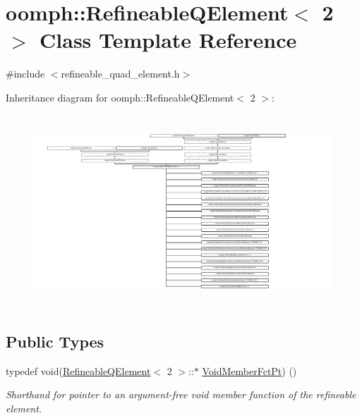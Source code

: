 \hypertarget{classoomph_1_1RefineableQElement_3_012_01_4}{}\section{oomph\+:\+:Refineable\+Q\+Element$<$ 2 $>$ Class Template Reference}
\label{classoomph_1_1RefineableQElement_3_012_01_4}


{\ttfamily \#include $<$refineable\+\_\+quad\+\_\+element.\+h$>$}

Inheritance diagram for oomph\+:\+:Refineable\+Q\+Element$<$ 2 $>$\+:\begin{figure}[H]
\begin{center}
\leavevmode
\includegraphics[height=7.231405cm]{classoomph_1_1RefineableQElement_3_012_01_4}
\end{center}
\end{figure}
\subsection*{Public Types}
\begin{DoxyCompactItemize}
\item 
typedef void(\hyperlink{classoomph_1_1RefineableQElement}{Refineable\+Q\+Element}$<$ 2 $>$\+::$\ast$ \hyperlink{classoomph_1_1RefineableQElement_3_012_01_4_a418221e0f1056066064405e6f0795383}{Void\+Member\+Fct\+Pt}) ()
\begin{DoxyCompactList}\small\item\em Shorthand for pointer to an argument-\/free void member function of the refineable element. \end{DoxyCompactList}\end{DoxyCompactItemize}
